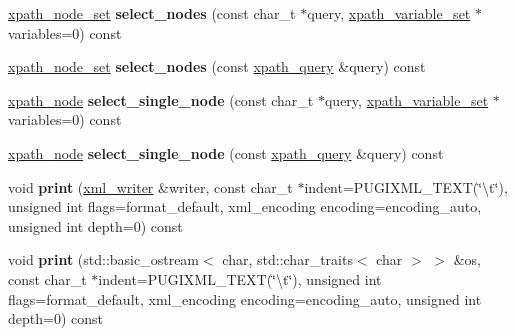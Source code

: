 \begin{DoxyCompactItemize}
\item 
\hypertarget{classpugi_1_1xml__node_a32ade4ad1281495923687321825dbb1b}{}\hyperlink{classpugi_1_1xpath__node__set}{xpath\+\_\+node\+\_\+set} {\bfseries select\+\_\+nodes} (const char\+\_\+t $\ast$query, \hyperlink{classpugi_1_1xpath__variable__set}{xpath\+\_\+variable\+\_\+set} $\ast$variables=0) const \label{classpugi_1_1xml__node_a32ade4ad1281495923687321825dbb1b}

\item 
\hypertarget{classpugi_1_1xml__node_acc6e39ed181fac7f56e69280ad51fac6}{}\hyperlink{classpugi_1_1xpath__node__set}{xpath\+\_\+node\+\_\+set} {\bfseries select\+\_\+nodes} (const \hyperlink{classpugi_1_1xpath__query}{xpath\+\_\+query} \&query) const \label{classpugi_1_1xml__node_acc6e39ed181fac7f56e69280ad51fac6}

\item 
\hypertarget{classpugi_1_1xml__node_a51ae1ebf6d78f80f9e91f5d64c143d78}{}\hyperlink{classpugi_1_1xpath__node}{xpath\+\_\+node} {\bfseries select\+\_\+single\+\_\+node} (const char\+\_\+t $\ast$query, \hyperlink{classpugi_1_1xpath__variable__set}{xpath\+\_\+variable\+\_\+set} $\ast$variables=0) const \label{classpugi_1_1xml__node_a51ae1ebf6d78f80f9e91f5d64c143d78}

\item 
\hypertarget{classpugi_1_1xml__node_a94b942e9f4438836b62d260ee65ab43f}{}\hyperlink{classpugi_1_1xpath__node}{xpath\+\_\+node} {\bfseries select\+\_\+single\+\_\+node} (const \hyperlink{classpugi_1_1xpath__query}{xpath\+\_\+query} \&query) const \label{classpugi_1_1xml__node_a94b942e9f4438836b62d260ee65ab43f}

\item 
\hypertarget{classpugi_1_1xml__node_aed2c5f51a149e116cfe7970c6a5df749}{}void {\bfseries print} (\hyperlink{classpugi_1_1xml__writer}{xml\+\_\+writer} \&writer, const char\+\_\+t $\ast$indent=P\+U\+G\+I\+X\+M\+L\+\_\+\+T\+E\+X\+T(\char`\"{}\textbackslash{}t\char`\"{}), unsigned int flags=format\+\_\+default, xml\+\_\+encoding encoding=encoding\+\_\+auto, unsigned int depth=0) const \label{classpugi_1_1xml__node_aed2c5f51a149e116cfe7970c6a5df749}

\item 
\hypertarget{classpugi_1_1xml__node_a930c02bae5ea9cc206ba358eaff96238}{}void {\bfseries print} (std\+::basic\+\_\+ostream$<$ char, std\+::char\+\_\+traits$<$ char $>$ $>$ \&os, const char\+\_\+t $\ast$indent=P\+U\+G\+I\+X\+M\+L\+\_\+\+T\+E\+X\+T(\char`\"{}\textbackslash{}t\char`\"{}), unsigned int flags=format\+\_\+default, xml\+\_\+encoding encoding=encoding\+\_\+auto, unsigned int depth=0) const \label{classpugi_1_1xml__node_a930c02bae5ea9cc206ba358eaff96238}


\end{DoxyCompactItemize}
